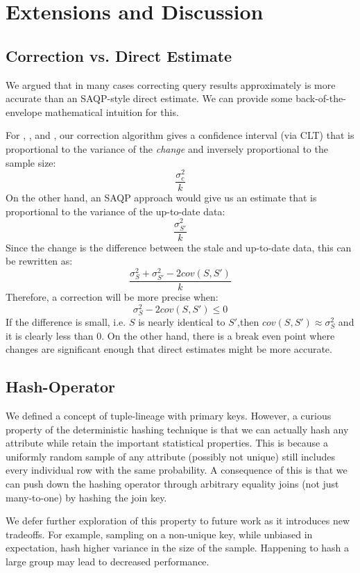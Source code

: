 
\section{Extensions and Discussion}\label{sec:ext}
\subsection{Correction vs. Direct Estimate}
We argued that in many cases correcting query results approximately is more accurate than an
SAQP-style direct estimate. 
We can provide some back-of-the-envelope mathematical intuition for this.

For \sumfunc, \countfunc, and \avgfunc, our correction algorithm gives a confidence interval (via CLT) that is
proportional to the variance of the \emph{change} and inversely proportional to the sample size:
\[\frac{\sigma_{c}^2}{k}\]
On the other hand, an SAQP approach would give us an estimate that is proportional to the variance of the up-to-date data:
\[\frac{\sigma_{S'}^2}{k}\]
Since the change is the difference between the stale and up-to-date data, this can be rewritten as: 
\[\frac{\sigma_{S}^2 + \sigma_{S'}^2 - 2cov(S,S')}{k}\]
Therefore, a correction will be more precise when:
\[\sigma_{S}^2 - 2cov(S,S') \le 0 \]
If the difference is small, i.e. $S$ is nearly identical to $S'$,then $cov(S,S') \approx \sigma_{S}^2$ and it is clearly less than 0. 
On the other hand, there is a break even point where changes are significant enough that direct estimates might be more accurate.

\subsection{Hash-Operator}
We defined a concept of tuple-lineage with primary keys.
However, a curious property of the deterministic hashing technique is that we can actually hash any attribute while retain the important
statistical properties.
This is because a uniformly random sample of any attribute (possibly not unique) still includes every individual row with the same probability.  
A consequence of this is that we can push down the hashing operator through arbitrary equality joins (not just many-to-one) by hashing the join key.

We defer further exploration of this property to future work as it introduces new tradeoffs.
For example, sampling on a non-unique key, while unbiased in expectation, hash higher variance in the size of the sample.
Happening to hash a large group may lead to decreased performance. 

